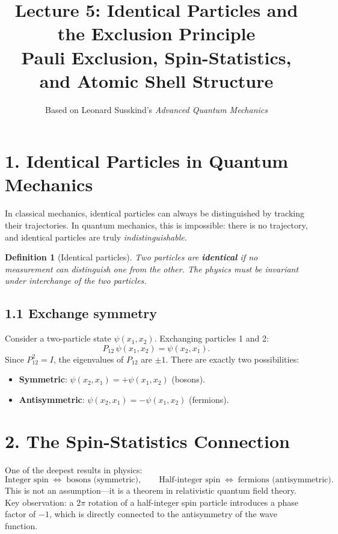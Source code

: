 \documentclass[12pt,a4paper]{article}
\title{\textbf{Lecture 5: Identical Particles and the Exclusion Principle} \\ \large Pauli Exclusion, Spin-Statistics, and Atomic Shell Structure}
\author{Based on Leonard Susskind's \textit{Advanced Quantum Mechanics}}
\date{}
\newtheorem{definition}{Definition}
\begin{document}
\maketitle
\thispagestyle{fancy}

\section{1. Identical Particles in Quantum Mechanics}

In classical mechanics, identical particles can always be distinguished by tracking their trajectories.  In quantum mechanics, this is impossible: there is no trajectory, and identical particles are truly \emph{indistinguishable}.

\begin{definition}[Identical particles]
Two particles are \textbf{identical} if no measurement can distinguish one from the other.  The physics must be invariant under interchange of the two particles.
\end{definition}

\subsection{1.1 Exchange symmetry}

Consider a two-particle state $\psi(x_1, x_2)$.  Exchanging particles 1 and 2:
\[
    P_{12}\,\psi(x_1, x_2) = \psi(x_2, x_1).
\]
Since $P_{12}^2 = I$, the eigenvalues of $P_{12}$ are $\pm 1$.  There are exactly two possibilities:
\begin{itemize}[nosep]
    \item \textbf{Symmetric}: $\psi(x_2, x_1) = +\psi(x_1, x_2)$ \quad (bosons).
    \item \textbf{Antisymmetric}: $\psi(x_2, x_1) = -\psi(x_1, x_2)$ \quad (fermions).
\end{itemize}

\section{2. The Spin-Statistics Connection}

One of the deepest results in physics:
\[
    \boxed{\text{Integer spin} \;\Longleftrightarrow\; \text{bosons (symmetric)}, \qquad \text{Half-integer spin} \;\Longleftrightarrow\; \text{fermions (antisymmetric)}.}
\]
This is not an assumption---it is a theorem in relativistic quantum field theory.  Key observation: a $2\pi$ rotation of a half-integer spin particle introduces a phase factor of $-1$, which is directly connected to the antisymmetry of the wave function.
\end{document}
